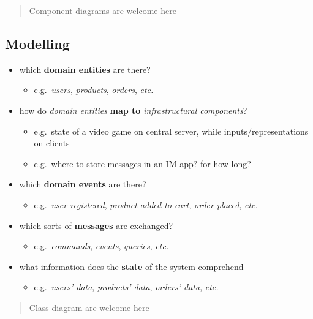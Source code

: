 \documentclass{scrartcl}
\begin{document}
\begin{quote}
Component diagrams are welcome here
\end{quote}

\subsection{Modelling}\label{modelling}

\begin{itemize}
  \item which \textbf{domain entities} are there?
  \begin{itemize}
    \item e.g.~\emph{users}, \emph{products}, \emph{orders}, \emph{etc.}
  \end{itemize}
  
  \item how do \emph{domain entities} \textbf{map to} \emph{infrastructural components}?
  \begin{itemize}
    \item e.g.~state of a video game on central server, while inputs/representations on clients
    \item e.g.~where to store messages in an IM app? for how long?
  \end{itemize}

  \item which \textbf{domain events} are there?
  \begin{itemize}
    \item e.g.~\emph{user registered}, \emph{product added to cart}, \emph{order placed}, \emph{etc.}
  \end{itemize}
  
  \item which sorts of \textbf{messages} are exchanged?
  \begin{itemize}
    \item e.g.~\emph{commands}, \emph{events}, \emph{queries}, \emph{etc.}
  \end{itemize}

  \item what information does the \textbf{state} of the system comprehend
  \begin{itemize}
    \item e.g.~\emph{users' data}, \emph{products' data}, \emph{orders' data}, \emph{etc.}
  \end{itemize}
\end{itemize}

\begin{quote}
Class diagram are welcome here
\end{quote}
\end{document}

